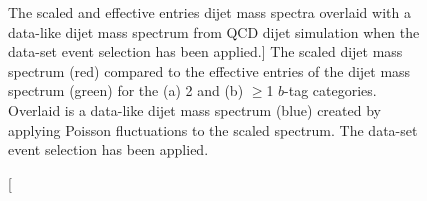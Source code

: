 \begin{figure}[!ht]
  \begin{center}
   \captionsetup[subfigure]{aboveskip=0pt,justification=centering}
  \end{center}
  \vspace{-1em}
  \caption
      [The scaled and effective entries dijet mass spectra overlaid with a data-like dijet mass spectrum
        from QCD dijet simulation when the \summer{} data-set event selection has been applied.]
      {The scaled dijet mass spectrum (red) compared to the
        effective entries of the dijet mass spectrum (green)
        for the (a) 2 and (b) $\geq$1 $b$-tag categories.
        Overlaid is a data-like dijet mass spectrum (blue) created by applying Poisson fluctuations to the scaled spectrum.
        The \summer{} data-set event selection has been applied.}
  \label{fig:effEntDataLike}
  \begin{center}
   \captionsetup[subfigure]{aboveskip=0pt,justification=centering}

\end{center}
\end{figure}
